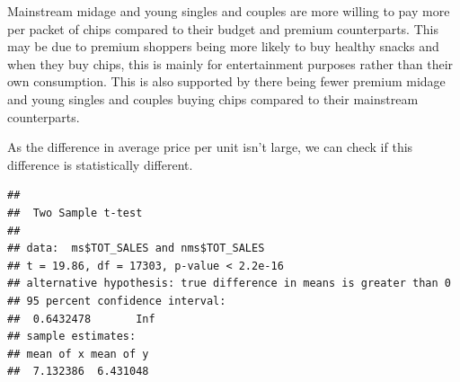 \documentclass[
]{article}
\newenvironment{Shaded}{\begin{snugshade}}{\end{snugshade}}
\newcommand{\AttributeTok}[1]{\textcolor[rgb]{0.13,0.29,0.53}{#1}}
\newcommand{\CommentTok}[1]{\textcolor[rgb]{0.56,0.35,0.01}{\textit{#1}}}
\newcommand{\DocumentationTok}[1]{\textcolor[rgb]{0.56,0.35,0.01}{\textbf{\textit{#1}}}}
\newcommand{\FloatTok}[1]{\textcolor[rgb]{0.00,0.00,0.81}{#1}}
\newcommand{\FunctionTok}[1]{\textcolor[rgb]{0.13,0.29,0.53}{\textbf{#1}}}
\newcommand{\NormalTok}[1]{#1}
\newcommand{\OtherTok}[1]{\textcolor[rgb]{0.56,0.35,0.01}{#1}}
\newcommand{\SpecialCharTok}[1]{\textcolor[rgb]{0.81,0.36,0.00}{\textbf{#1}}}
\newcommand{\StringTok}[1]{\textcolor[rgb]{0.31,0.60,0.02}{#1}}
\begin{document}
Mainstream midage and young singles and couples are more willing to pay
more per packet of chips compared to their budget and premium
counterparts. This may be due to premium shoppers being more likely to
buy healthy snacks and when they buy chips, this is mainly for
entertainment purposes rather than their own consumption. This is also
supported by there being fewer premium midage and young singles and
couples buying chips compared to their mainstream counterparts.

As the difference in average price per unit isn't large, we can check if
this difference is statistically different.

\begin{Shaded}
\end{Shaded}

\begin{verbatim}
## 
##  Two Sample t-test
## 
## data:  ms$TOT_SALES and nms$TOT_SALES
## t = 19.86, df = 17303, p-value < 2.2e-16
## alternative hypothesis: true difference in means is greater than 0
## 95 percent confidence interval:
##  0.6432478       Inf
## sample estimates:
## mean of x mean of y 
##  7.132386  6.431048
\end{verbatim}
\end{document}
